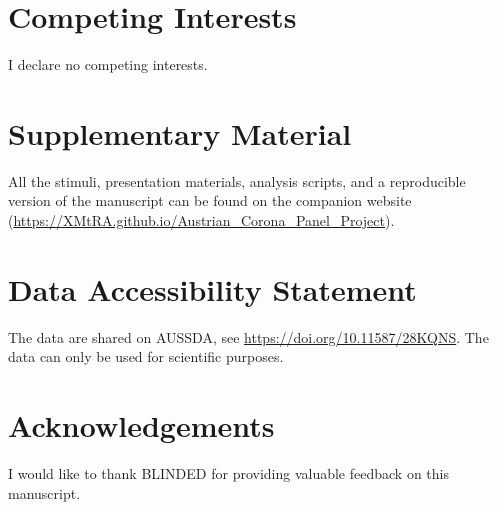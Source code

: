 \documentclass[
  man,floatsintext]{apa7}
\begin{document}
\hypertarget{competing-interests}{%
\section{Competing Interests}\label{competing-interests}}

I declare no competing interests.

\hypertarget{supplementary-material}{%
\section{Supplementary Material}\label{supplementary-material}}

All the stimuli, presentation materials, analysis scripts, and a reproducible version of the manuscript can be found on the companion website (\url{https://XMtRA.github.io/Austrian_Corona_Panel_Project}).

\hypertarget{data-accessibility-statement}{%
\section{Data Accessibility Statement}\label{data-accessibility-statement}}

The data are shared on AUSSDA, see \url{https://doi.org/10.11587/28KQNS}.
The data can only be used for scientific purposes.

\hypertarget{acknowledgements}{%
\section{Acknowledgements}\label{acknowledgements}}

I would like to thank BLINDED for providing valuable feedback on this manuscript.
\end{document}
